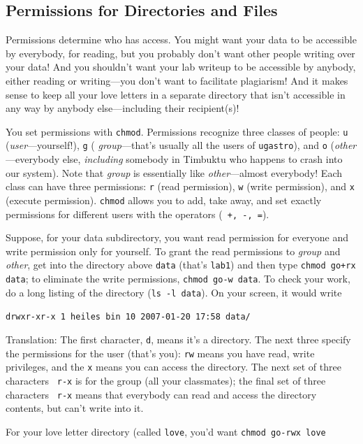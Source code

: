 \documentclass[psfig,preprint]{aastex}
\begin{document}
\subsection{Permissions for Directories and Files} \label{perm}

Permissions determine who has access. You might want your data to be
accessible by everybody, for reading, but you probably don't want other
people writing over your data!  And you shouldn't want your lab writeup
to be accessible by anybody, either reading or writing---you don't want
to facilitate plagiarism! And it makes sense to keep all your love
letters in a separate directory that isn't accessible in any way by
anybody else---including their recipient(s)!

You set permissions with {\tt chmod}.  Permissions recognize three
classes of people: {\tt u} ({\it user}---yourself!), {\tt g} ({\it
group}---that's usually all the users of {\tt ugastro}), and {\tt o}
({\it other}---everybody else, {\it including} somebody in Timbuktu who
happens to crash into our system). Note that {\it group} is essentially
like {\it other}---almost everybody! Each class can have three
permissions: {\tt r} (read permission), {\tt w} (write permission), and
{\tt x} (execute permission).  {\tt chmod} allows you to add, take away,
and set exactly permissions for different users with the operators ({\tt
+, -, =}).

Suppose, for your data subdirectory, you want read permission for
everyone and write permission only for yourself. To grant the read
permissions to {\it group} and {\it other}, get into the directory above
{\tt data} (that's {\tt lab1}) and then type {\tt chmod go+rx data}; to
eliminate the write permissions, {\tt chmod go-w data}. To check your
work, do a long listing of the directory ({\tt ls -l data}). On your
screen, it would write

\noindent \verb$drwxr-xr-x 1 heiles bin 10 2007-01-20 17:58 data/$

\noindent Translation: The first character, {\tt d}, means it's a
directory. The next three specify the permissions for the user (that's
you): {\tt rw} means you have read, write privileges, and the {\tt x} means
you can access the directory. The next set of three characters {\tt
  r-x} is for
the group (all your classmates); the final set of three characters {\tt
  r-x} means that everybody can read and access the directory contents,
but can't write into it.

For your love letter directory (called {\tt love}, you'd want {\tt chmod
  go-rwx love}
\end{document}

